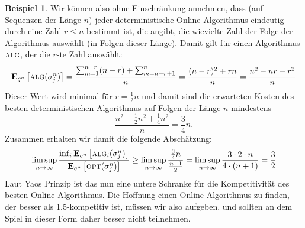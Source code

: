 \documentclass[a4paper,ngerman,12pt,bibtotoc]{scrartcl}
\theoremstyle{definition}
\newtheorem{bsp}[defn]{Beispiel}
\theoremstyle{plain}
\theoremstyle{remark}
\renewcommand{\_}{\mathpunct{.}\,}
\newcommand{\?}{\,{:}\,}
\newcommand{\Alg}{\ensuremath{\textsc{alg}}}
\newcommand{\Opt}{\ensuremath{\textsc{opt}}}
\newcommand{\EE}{\mathbf{E}}
\newcommand{\sjn}{\sigma_j^n}
\begin{document}
\begin{bsp}
		Wir können also ohne Einschränkung annehmen, dass (auf Sequenzen der Länge $n$) jeder deterministische Online-Algorithmus eindeutig durch eine Zahl $r\leq n$ bestimmt ist, die angibt, die wievielte Zahl der Folge der Algorithmus auswählt (in Folgen dieser Länge). Damit gilt für einen Algorithmus $\Alg$, der die $r$-te Zahl auswählt:
		\begin{equation*}
		\EE_{q^n}\left[\Alg(\sigma^n_j)\right] = \frac{\sum_{m=1}^{n-r}(n-r) + \sum_{m=n-r+1}^{n}}{n} = \frac{(n-r)^2 + rn}{n} = \frac{n^2-nr+r^2}{n}
		\end{equation*}	
		Dieser Wert wird minimal für $r = \frac{1}{2}n$ und damit sind die erwarteten Kosten des besten deterministischen Algorithmus auf Folgen der Länge $n$ mindestens
		\[\frac{n^2-\frac{1}{2}n^2 + \frac{1}{4}n^2}{n} = \frac{3}{4}n.\]
		Zusammen erhalten wir damit die folgende Abschätzung:
		\[\limsup_{n\to\infty} \frac{\inf_i\EE_{q^n}\left[\Alg_i(\sjn)\right]}{\EE_{q^n}\left[\Opt(\sjn)\right]} \geq \limsup_{n\to\infty}\frac{\frac{3}{4}n}{\frac{n+1}{2}} = \limsup_{n\to\infty} \frac{3\cdot 2\cdot n}{4\cdot (n+1)} = \frac{3}{2}\]
		Laut Yaos Prinzip ist das nun eine untere Schranke für die Kompetitivität des besten Online-Algorithmus. Die Hoffnung einen Online-Algorithmus zu finden, der besser als 1,5-kompetitiv ist, müssen wir also aufgeben, und sollten an dem Spiel in dieser Form daher besser nicht teilnehmen.
	\end{bsp}	

	\nocite{*}
	\printbibliography		
			
\end{document}
